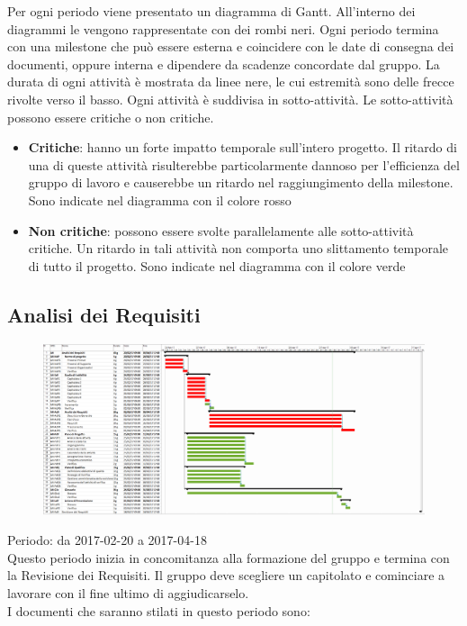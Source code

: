 Per ogni periodo viene presentato un diagramma di Gantt.
All'interno dei diagrammi le  vengono rappresentate con dei rombi neri.
Ogni periodo termina con una milestone che può essere esterna e coincidere con le
date di consegna dei documenti, oppure interna e dipendere da scadenze concordate
dal gruppo.
La durata di ogni attività è mostrata da linee nere, le cui estremità sono
delle frecce rivolte verso il basso. Ogni attività è suddivisa in sotto-attività.
Le sotto-attività possono essere critiche o non critiche.

\begin{itemize}
\item \textbf{Critiche}: hanno un forte impatto temporale sull’intero progetto.
  Il ritardo di una di queste attività risulterebbe particolarmente dannoso per
  l’efficienza del gruppo di lavoro e causerebbe un ritardo nel raggiungimento della
  milestone.
  Sono indicate nel diagramma con il colore rosso
\item \textbf{Non critiche}: possono essere svolte parallelamente alle sotto-attività critiche.
  Un ritardo in tali attività non comporta uno slittamento temporale di tutto il progetto.
  Sono indicate nel diagramma con il colore verde
\end{itemize}

\subsection{Analisi dei Requisiti}

\begin{figure}
  \centering
  \includegraphics[scale=0.28]{img/1-AR.png}
\end{figure}

Periodo: da 2017-02-20 a 2017-04-18 \\
Questo periodo inizia in concomitanza alla formazione del gruppo e termina con la Revisione dei Requisiti. Il gruppo deve scegliere un capitolato e cominciare a lavorare con il fine ultimo di aggiudicarselo.\\
I documenti che saranno stilati in questo periodo sono:


